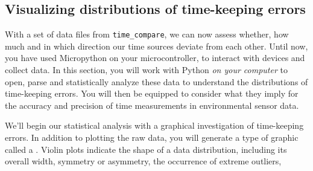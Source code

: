 \begin{enumerate}
	
	
\end{enumerate}


\subsection{Visualizing distributions of time-keeping errors}

With a set of data files from \lstinline{time_compare}, we can now assess whether, how much and in which direction our time sources deviate from each other. 
Until now, you have used Micropython on your microcontroller, to interact with devices and collect data.
In this section, you will work with Python \emph{on your computer} to open, parse and statistically analyze these data to understand the distributions of time-keeping errors.
You will then be equipped to consider what they imply for the accuracy and precision of time measurements in environmental sensor data.  

We'll begin our statistical analysis with a graphical investigation of time-keeping errors. 
In addition to plotting the raw data, you will generate a type of graphic called a .
Violin plots indicate the shape of a data distribution, including its overall width, symmetry or asymmetry, the occurrence of extreme outliers, \etc

